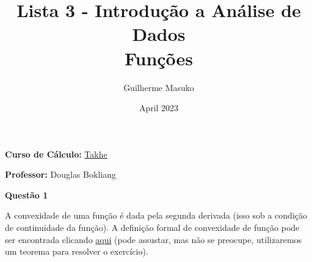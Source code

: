 \documentclass[12pt, a4paper]{article}
\title{Lista 3 - Introdução a Análise de Dados \\
	Funções}
\author{Guilherme Masuko}
\date{April 2023}
\begin{document}
	
\clearpage
\maketitle
\thispagestyle{empty}

\textbf{Curso de Cálculo:} \href{https://cursos.takhe.com.br/}{Takhe}

\textbf{Professor:} Douglas Bokliang

\vspace{1cm}



\textbf{Questão 1}

A convexidade de uma função é dada pela segunda derivada (isso sob a condição de continuidade da função). A definição formal de convexidade de função pode ser encontrada clicando \href{https://pt.wikipedia.org/wiki/Fun\%C3\%A7\%C3\%A3o\_convexa}{aqui} (pode assustar, mas não se preocupe, utilizaremos um teorema para resolver o exercício).
\end{document}
